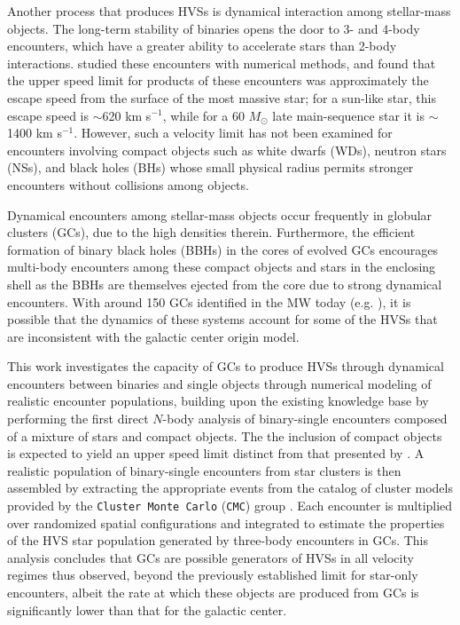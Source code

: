 \documentclass[twocolumn]{aastex631}
\newcommand{\CMC}{\texttt{CMC}}
\begin{document}
Another process that produces HVSs is dynamical interaction among stellar-mass objects.
The long-term stability of binaries opens the door to 3- and 4-body encounters, which have a greater ability to accelerate stars than 2-body interactions.
\citet{1991AJ....101..562L} studied these encounters with numerical methods, and found that the upper speed limit for products of these encounters was approximately the escape speed from the surface of the most massive star; for a sun-like star, this escape speed is $\sim$620 km s$^{-1}$, while for a 60 $M_\odot$ late main-sequence star it is $\sim$1400 km s$^{-1}$.
However, such a velocity limit has not been examined for encounters involving compact objects such as white dwarfs (WDs), neutron stars (NSs), and black holes (BHs) whose small physical radius permits stronger encounters without collisions among objects.

Dynamical encounters among stellar-mass objects occur frequently in globular clusters (GCs), due to the high densities therein.
Furthermore, the efficient formation of binary black holes (BBHs) in the cores of evolved GCs \citep{2005MNRAS.358..572I} encourages multi-body encounters among these compact objects and stars in the enclosing shell as the BBHs are themselves ejected from the core due to strong dynamical encounters.
With around 150 GCs identified in the MW today (e.g. \citealt{2018MNRAS.478.1520B}), it is possible that the dynamics of these systems account for some of the HVSs that are inconsistent with the galactic center origin model.

This work investigates the capacity of GCs to produce HVSs through dynamical encounters between binaries and single objects through numerical modeling of realistic encounter populations, building upon the existing knowledge base by performing the first direct $N$-body analysis of binary-single encounters composed of a mixture of stars and compact objects.
The the inclusion of compact objects is expected to yield an upper speed limit distinct from that presented by \citealt{1991AJ....101..562L}.
A realistic population of binary-single encounters from star clusters is then assembled by extracting the appropriate events from the catalog of cluster models provided by the {\tt\string Cluster Monte Carlo} (\CMC) group \citep{2020ApJS..247...48K}.
Each encounter is multiplied over randomized spatial configurations and integrated to estimate the properties of the HVS star population generated by three-body encounters in GCs.
This analysis concludes that GCs are possible generators of HVSs in all velocity regimes thus observed, beyond the previously established limit for star-only encounters, albeit the rate at which these objects are produced from GCs is significantly lower than that for the galactic center.
\end{document}
